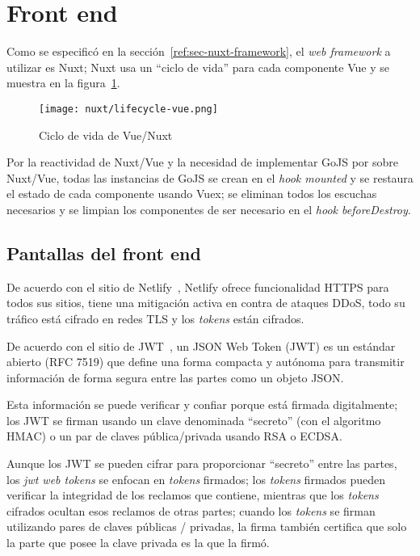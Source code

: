 
\section{Front end}


Como se especificó en la sección~\ref{ref:sec-nuxt-framework}, el \textit{web framework} a utilizar es Nuxt; Nuxt usa un  ``ciclo de vida'' para cada componente Vue y se muestra en la figura~\ref{img:nuxt-lifecycle}.


\begin{figure}[H]
    \centering
    \texttt{[image: nuxt/lifecycle-vue.png]}
    \caption{Ciclo de vida de Vue/Nuxt}
    \label{img:nuxt-lifecycle}
  \end{figure}
  
Por la reactividad de Nuxt/Vue y la necesidad de implementar GoJS por sobre Nuxt/Vue, todas las instancias de GoJS se crean en el \textit{hook mounted} y se restaura el estado de cada componente usando Vuex; se eliminan todos los escuchas necesarios y se limpian los componentes de ser necesario en el \textit{hook beforeDestroy}.

\subsection{Pantallas del front end}

De acuerdo con el sitio de Netlify~\cite{netlify_netlify_nodate}, Netlify ofrece funcionalidad HTTPS para todos sus sitios, tiene una mitigación activa en contra de ataques DDoS, todo su tráfico está cifrado en redes TLS y los \textit{tokens} están cifrados.

De acuerdo con el sitio de JWT~\cite{jwt_web_2020}, un JSON Web Token (JWT) es un estándar abierto (RFC 7519) que define una forma compacta y autónoma para transmitir información de forma segura entre las partes como un objeto JSON.


Esta información se puede verificar y confiar porque está firmada digitalmente; los JWT se firman usando un clave denominada ``secreto'' (con el algoritmo HMAC) o un par de claves pública/privada usando RSA o ECDSA.

Aunque los JWT se pueden cifrar para proporcionar ``secreto'' entre las partes, los \textit{jwt web tokens} se enfocan en \textit{tokens} firmados; los \textit{tokens} firmados pueden verificar la integridad de los reclamos que contiene, mientras que los \textit{tokens} cifrados ocultan esos reclamos de otras partes; cuando los \textit{tokens} se firman utilizando pares de claves públicas / privadas, la firma también certifica que solo la parte que posee la clave privada es la que la firmó.


